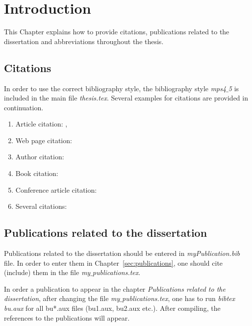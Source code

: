 \chapter{Introduction}

This Chapter explains how to provide citations, publications related to the dissertation and abbreviations throughout the thesis. 

\section{Citations}
In order to use the correct bibliography style, the bibliography style \textit{mps4$\_$5} is included in the main file \textit{thesis.tex}. Several examples for citations are provided in continuation.

\begin{enumerate}
	\item Article citation: \cite{Saaty2003a}, \citep{Saaty2003}
	\item Web page citation: \citep{TheEconomist2010}
	\item Author citation: \cite{Zopounidis2006}
	\item Book citation: \citep{BohanecDEXi2011}
	\item Conference article citation: \citep{Baracskai2003}
	\item Several citations: 
	\subitem \citep{BohanecDEXi2011, Burstein2008, Power2002}
	\subitem  \citep{Skinner1999, Ronald} 
	\subitem   \citep{Triantaphyllou, French, Bouyssou2006}
	\subitem \citep{Figueira2005}
	\subitem \citep{Jacquet-Lagreze1982} 
	\subitem \citep{Saaty2008}
	\subitem \citep{Moshkovich1995}
	\subitem \citep{GrecoRSMCDA}
	\subitem \citep{Adam2008, Figueira2005, Bouyssou2006}
	\subitem \citep{Menzies2006, Saaty2008, Zadeh1975, Guo2009, Barron1996} 
\end{enumerate}

\section{Publications related to the dissertation}
Publications related to the dissertation should be entered in  \textit{myPublication.bib} file. In order to enter them in Chapter~\ref{sec:publications}, one should cite (include) them in the file \textit{my$\_$publications.tex}.

In order a publication to appear in the chapter \emph{Publications related to the dissertation}, after changing the file \textit{my$\_$publications.tex}, one has to run \textit{bibtex bu.aux} for all bu*.aux files (bu1.aux, bu2.aux etc.). After compiling, the references to the publications will appear.


